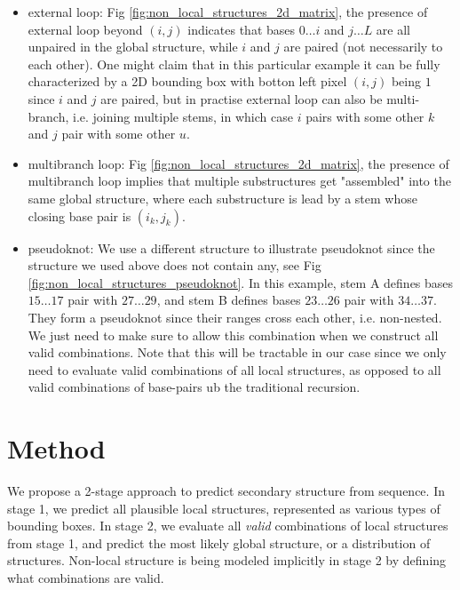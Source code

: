 \documentclass[12pt]{article}
\begin{document}
\begin{itemize}
    \item external loop: Fig \ref{fig:non_local_structures_2d_matrix},
    the presence of external loop beyond $(i, j)$ indicates that
    bases $0 \dots i$ and $j \dots L$ are all unpaired in the global structure,
    while $i$ and $j$ are paired (not necessarily to each other).
    One might claim that in this particular example it can be fully characterized by a 2D bounding box
    with botton left pixel $(i, j)$ being $1$ since $i$ and $j$ are paired,
    but in practise external loop can also be multi-branch,
    i.e. joining multiple stems, in which case $i$ pairs with some other $k$ and $j$ pair with some other $u$.

    \item multibranch loop: Fig \ref{fig:non_local_structures_2d_matrix},
    the presence of multibranch loop implies that multiple substructures get
    "assembled" into the same global structure, where each substructure is lead
    by a stem whose closing base pair is $(i_k, j_k)$.

    \item pseudoknot: We use a different structure to illustrate pseudoknot
    since the structure we used above does not contain any, see Fig \ref{fig:non_local_structures_pseudoknot}.
    In this example, stem A defines bases $15 \dots 17$ pair with $27 \dots 29$,
    and stem B defines bases $23 \dots 26$ pair with $34 \dots 37$.
    They form a pseudoknot since their ranges cross each other, i.e. non-nested.
    We just need to make sure to allow this combination when we construct all valid combinations.
    Note that this will be tractable in our case since we only need to evaluate valid combinations of all local structures,
    as opposed to all valid combinations of base-pairs ub the traditional recursion.


\end{itemize}



\section{Method}

We propose a 2-stage approach to predict secondary structure from sequence.
In stage 1, we predict all plausible local structures, represented as various types of bounding boxes.
In stage 2, we evaluate all \textit{valid} combinations of local structures from stage 1,
and predict the most likely global structure, or a distribution of structures.
Non-local structure is being modeled implicitly in stage 2 by defining what combinations are valid.
\end{document}
